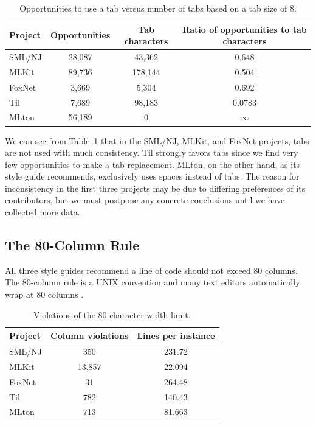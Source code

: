 \documentclass[12pt,abstracton]{scrartcl}
\begin{document}
\begin{table}[h!]
\centering
\begin{tabular}{|l||c|c||c|}
\hline
Project & Opportunities & Tab characters & Ratio of opportunities to tab characters \\ \hline\hline
SML/NJ & 28,087 & 43,362 & 0.648 \\
MLKit & 89,736 & 178,144 & 0.504 \\
FoxNet & 3,669 & 5,304 & 0.692 \\
Til & 7,689 & 98,183 & 0.0783 \\
MLton & 56,189 & 0 & $\infty$ \\ \hline
\end{tabular}
\caption{Opportunities to use a tab versus number of tabs based on a tab size of 8.}
\label{table:tabs}
\end{table}

We can see from Table~\ref{table:tabs} that
in the SML/NJ, MLKit, and FoxNet projects,
tabs are not used with much consistency. 
Til strongly favors tabs since we find very few opportunities to make a tab replacement.
MLton, on the other hand, as its style guide recommends, exclusively
uses spaces instead of tabs. The reason for inconsistency in the first three projects
may be due to differing preferences of its contributors, but we must postpone
any concrete conclusions until we have collected more data.
\subsection{The 80-Column Rule}\label{subsec:80}
All three style guides recommend a line of code should not exceed 80 columns.
The 80-column rule is a UNIX convention and many text editors automatically
wrap at 80 columns \cite{Cmu12}.

\begin{table}[t!]
\centering
\begin{tabular}{|l||c|c|}
\hline
Project & Column violations & Lines per instance \\ \hline\hline
SML/NJ & 350 & 231.72 \\
MLKit & 13,857 & 22.094 \\
FoxNet & 31 & 264.48 \\
Til & 782 & 140.43 \\
MLton & 713 & 81.663 \\ \hline
\end{tabular}
\caption{Violations of the 80-character width limit.}
\label{table:width}
\end{table}
\end{document}
